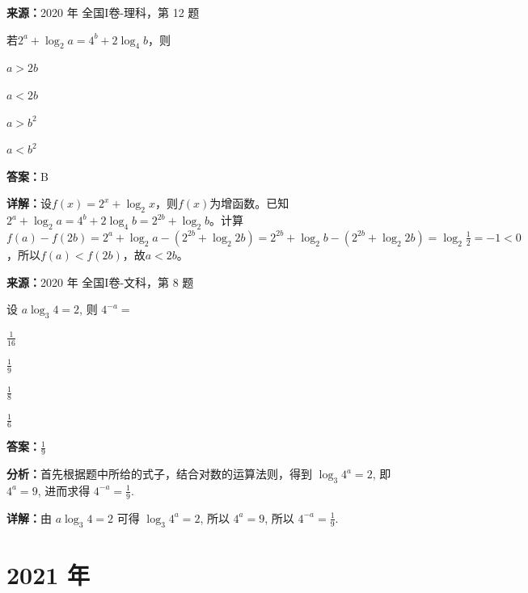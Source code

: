 \begin{question}[points=5]
\textbf{来源：}2020 年 全国I卷-理科，第 12 题\par
若$2^a+\log_2 a=4^b+2\log_4 b$，则
\begin{choices}
  \item $a>2b$
  \item $a<2b$
  \item $a>b^2$
  \item $a<b^2$
\end{choices}
\begin{solution}
\textbf{答案：}B

\textbf{详解：}设$f(x)=2^x+\log_2 x$，则$f(x)$为增函数。已知$2^a+\log_2 a=4^b+2\log_4 b=2^{2b}+\log_2 b$。计算$f(a)-f(2b)=2^a+\log_2 a-(2^{2b}+\log_2 2b)=2^{2b}+\log_2 b-(2^{2b}+\log_2 2b)=\log_2\frac{1}{2}=-1<0$，所以$f(a)<f(2b)$，故$a<2b$。
\end{solution}
\end{question}

\begin{question}[points=5]
\textbf{来源：}2020 年 全国I卷-文科，第 8 题\par
设 $a\log_3 4 = 2$, 则 $4^{-a} =$
\begin{choices}
  \item $\frac{1}{16}$
  \item $\frac{1}{9}$
  \item $\frac{1}{8}$
  \item $\frac{1}{6}$
\end{choices}
\begin{solution}
\textbf{答案：}$\frac{1}{9}$

\textbf{分析：}首先根据题中所给的式子，结合对数的运算法则，得到 $\log_3 4^a = 2$, 即 $4^a = 9$, 进而求得 $4^{-a} = \frac{1}{9}$.

\textbf{详解：}由 $a\log_3 4 = 2$ 可得 $\log_3 4^a = 2$, 所以 $4^a = 9$, 所以 $4^{-a} = \frac{1}{9}$.
\end{solution}
\end{question}

\section*{2021 年}


